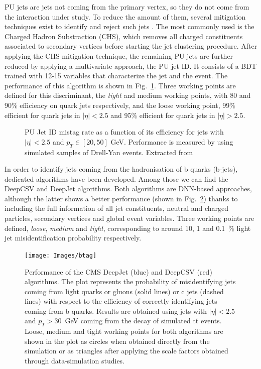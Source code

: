\documentclass[../main.tex]{subfiles}
\begin{document}
PU jets are jets not coming from the primary vertex, so they do not come from the interaction under study. To reduce the amount of them, several mitigation techniques exist to identify and reject such jets \cite{intro:id:pujet}. The most commonly used is the Charged Hadron Substraction (CHS), which removes all charged constituents associated to secondary vertices before starting the jet clustering procedure. After applying the CHS mitigation technique, the remaining PU jets are further reduced by applying a multivariate approach, the PU jet ID. It consists of a BDT trained with 12-15 variables that characterize the jet and the event. The performance of this algorithm is shown in Fig.~\ref{intro:fig:pujetid}.  Three working points are defined for this discriminant, the \textit{tight} and medium working points, with 80 and 90\% efficiency on quark jets respectively, and the loose working point, 99\% efficient for quark jets in $|\eta|<2.5$ and 95\% efficient for quark jets in $|\eta|>2.5$.


\begin{figure}[h!]
\begin{center}
\end{center}
\caption{PU Jet ID mistag rate as a function of its efficiency for jets with $|\eta|<2.5$ and $p_T\in[20, 50]$ GeV. Performance is measured by using simulated samples of Drell-Yan events. Extracted from \cite{intro:id:pujetid}}
\label{intro:fig:pujetid}
\end{figure}


In order to identify jets coming from the hadronisation of b quarks (b-jets), dedicated algorithms have been developed. Among those we can find the DeepCSV \cite{intro:id:deepcsv} and DeepJet \cite{intro:id:deepflavour} algorithms. Both algorithms are DNN-based approaches, although the latter shows a better performance (shown in Fig.~\ref{intro:fig:btag}) thanks to including the full information of all jet constituents, neutral and charged particles, secondary vertices and global event variables. Three working points are defined, \textit{loose}, \textit{medium} and \textit{tight}, corresponding to around 10, 1 and 0.1~\% light jet misidentification probability respectively.

\begin{figure}[h!]
\begin{center}
\texttt{[image: Images/btag]}
\end{center}
\caption{Performance of the CMS DeepJet (blue) and DeepCSV (red) algorithms.  
The plot represents the probability of misidentifying jets coming from light quarks or gluons (solid lines) or c jets (dashed lines) with respect to the efficiency of correctly identifying jets coming from b quarks. Results are obtained using jets with $|\eta|<2.5$ and $p_T>30$~GeV coming from the decay of simulated $\text{t}\bar{\text{t}}$ events. Loose, medium and tight working points for both algorithms are shown in the plot as circles when obtained directly from the simulation or as triangles after applying the scale factors obtained through data-simulation studies.}
\label{intro:fig:btag}
\end{figure}
\end{document}
